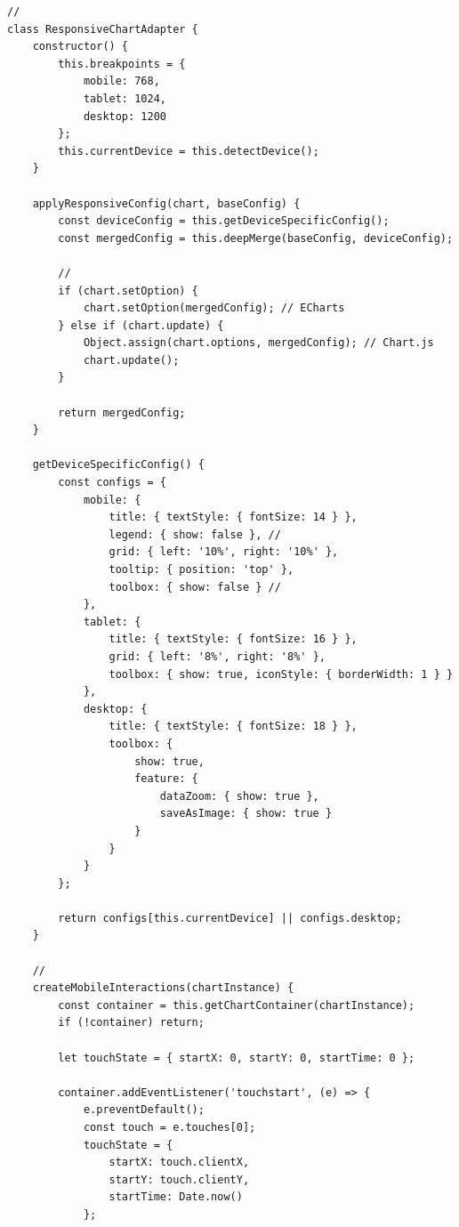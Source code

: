 \begin{verbatim}
// 
class ResponsiveChartAdapter {
    constructor() {
        this.breakpoints = {
            mobile: 768,
            tablet: 1024,
            desktop: 1200
        };
        this.currentDevice = this.detectDevice();
    }
    
    applyResponsiveConfig(chart, baseConfig) {
        const deviceConfig = this.getDeviceSpecificConfig();
        const mergedConfig = this.deepMerge(baseConfig, deviceConfig);
        
        // 
        if (chart.setOption) {
            chart.setOption(mergedConfig); // ECharts
        } else if (chart.update) {
            Object.assign(chart.options, mergedConfig); // Chart.js
            chart.update();
        }
        
        return mergedConfig;
    }
    
    getDeviceSpecificConfig() {
        const configs = {
            mobile: {
                title: { textStyle: { fontSize: 14 } },
                legend: { show: false }, // 
                grid: { left: '10%', right: '10%' },
                tooltip: { position: 'top' },
                toolbox: { show: false } // 
            },
            tablet: {
                title: { textStyle: { fontSize: 16 } },
                grid: { left: '8%', right: '8%' },
                toolbox: { show: true, iconStyle: { borderWidth: 1 } }
            },
            desktop: {
                title: { textStyle: { fontSize: 18 } },
                toolbox: {
                    show: true,
                    feature: {
                        dataZoom: { show: true },
                        saveAsImage: { show: true }
                    }
                }
            }
        };
        
        return configs[this.currentDevice] || configs.desktop;
    }
    
    // 
    createMobileInteractions(chartInstance) {
        const container = this.getChartContainer(chartInstance);
        if (!container) return;
        
        let touchState = { startX: 0, startY: 0, startTime: 0 };
        
        container.addEventListener('touchstart', (e) => {
            e.preventDefault();
            const touch = e.touches[0];
            touchState = {
                startX: touch.clientX,
                startY: touch.clientY,
                startTime: Date.now()
            };
            

\end{verbatim}
